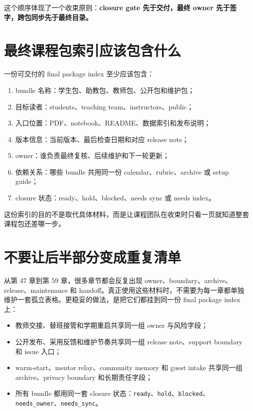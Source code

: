 这个顺序体现了一个收束原则：\textbf{closure gate 先于交付，最终 owner 先于签字，跨包同步先于最终目录。}

\section{最终课程包索引应该包含什么}

一份可交付的 final package index 至少应该包含：

\begin{enumerate}
    \item bundle 名称：学生包、助教包、教师包、公开包和维护包；
    \item 目标读者：students、teaching team、instructors、public；
    \item 入口位置：PDF、notebook、README、数据索引和发布说明；
    \item 版本信息：当前版本、最后检查日期和对应 release note；
    \item owner：谁负责最终复核、后续维护和下一轮更新；
    \item 依赖关系：哪些 bundle 共用同一份 calendar、rubric、archive 或 setup guide；
    \item closure 状态：ready、hold、blocked、needs sync 或 needs index。
\end{enumerate}

这份索引的目的不是取代具体材料，而是让课程团队在收束时只看一页就知道整套课程包还差哪一步。

\section{不要让后半部分变成重复清单}

从第 47 章到第 59 章，很多章节都会反复出现 owner、boundary、archive、release、maintenance 和 handoff。真正使用这些材料时，不需要为每一章都单独维护一套孤立表格。更稳妥的做法，是把它们都挂到同一份 final package index 上：

\begin{itemize}
    \item 教师交接、替班接管和学期重启共享同一组 owner 与风险字段；
    \item 公开发布、采用反馈和维护节奏共享同一组 release note、support boundary 和 issue 入口；
    \item warm-start、mentor relay、community memory 和 guest intake 共享同一组 archive、privacy boundary 和长期责任字段；
    \item 所有 bundle 都用同一套 closure 状态：\texttt{ready}、\texttt{hold}、\texttt{blocked}、\texttt{needs\_owner}、\texttt{needs\_sync}。
\end{itemize}

